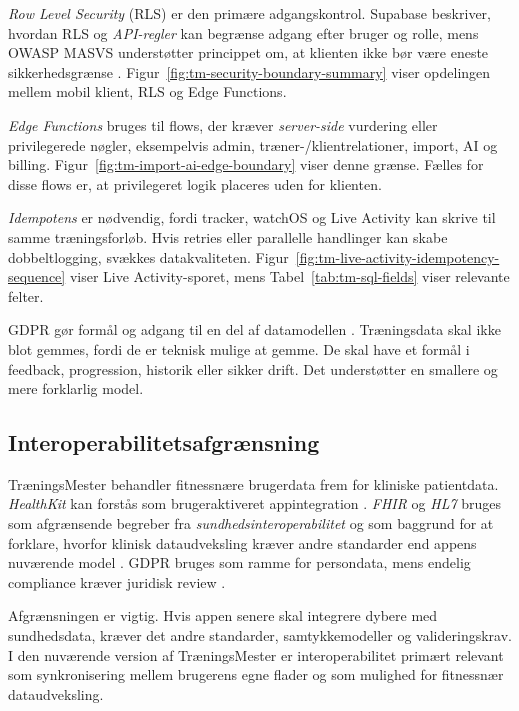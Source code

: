 \emph{Row Level Security} (RLS) er den primære adgangskontrol. Supabase beskriver, hvordan RLS og \emph{API-regler} kan begrænse adgang efter bruger og rolle, mens OWASP MASVS understøtter princippet om, at klienten ikke bør være eneste sikkerhedsgrænse \cite{supabase_rls_docs,supabase_securing_api_docs,owasp2024_masvs}. Figur~\ref{fig:tm-security-boundary-summary} viser opdelingen mellem mobil klient, RLS og Edge Functions.

\emph{Edge Functions} bruges til flows, der kræver \emph{server-side} vurdering eller privilegerede nøgler, eksempelvis admin, træner-/klientrelationer, import, AI og billing. Figur~\ref{fig:tm-import-ai-edge-boundary} viser denne grænse. Fælles for disse flows er, at privilegeret logik placeres uden for klienten.

\emph{Idempotens} er nødvendig, fordi tracker, watchOS og Live Activity kan skrive til samme træningsforløb. Hvis retries eller parallelle handlinger kan skabe dobbeltlogging, svækkes datakvaliteten. Figur~\ref{fig:tm-live-activity-idempotency-sequence} viser Live Activity-sporet, mens Tabel~\ref{tab:tm-sql-fields} viser relevante felter.

GDPR gør formål og adgang til en del af datamodellen \cite{europeanparliament2016_gdpr}. Træningsdata skal ikke blot gemmes, fordi de er teknisk mulige at gemme. De skal have et formål i feedback, progression, historik eller sikker drift. Det understøtter en smallere og mere forklarlig model.

\subsection{Interoperabilitetsafgrænsning}

TræningsMester behandler fitnessnære brugerdata frem for kliniske patientdata. \emph{HealthKit} kan forstås som brugeraktiveret appintegration \cite{apple_healthkit_docs}. \emph{FHIR} og \emph{HL7} bruges som afgrænsende begreber fra \emph{sundhedsinteroperabilitet} og som baggrund for at forklare, hvorfor klinisk dataudveksling kræver andre standarder end appens nuværende model \cite{benson2016_principles_health_interoperability,zajac2026_data_quality_interoperability}. GDPR bruges som ramme for persondata, mens endelig compliance kræver juridisk review \cite{europeanparliament2016_gdpr}.

Afgrænsningen er vigtig. Hvis appen senere skal integrere dybere med sundhedsdata, kræver det andre standarder, samtykkemodeller og valideringskrav. I den nuværende version af TræningsMester er interoperabilitet primært relevant som synkronisering mellem brugerens egne flader og som mulighed for fitnessnær dataudveksling.


